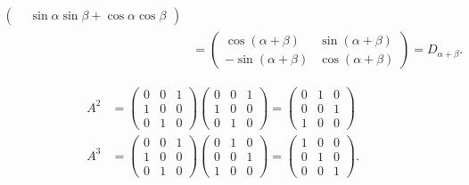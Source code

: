 \begin{loesung}
\begin{teilaufgaben}
\begin{align*}
\begin{pmatrix}
	&\sin\alpha\sin\beta+\cos\alpha\cos\beta
\end{pmatrix}
\\
&=
\begin{pmatrix}
 \cos(\alpha+\beta)&\sin(\alpha+\beta)\\
-\sin(\alpha+\beta)&\cos(\alpha+\beta)
\end{pmatrix}=D_{\alpha+\beta}.
\end{align*}
\item
\begin{align*}
A^2
&=
\begin{pmatrix}0&0&1\\1&0&0\\0&1&0\end{pmatrix}
\begin{pmatrix}0&0&1\\1&0&0\\0&1&0\end{pmatrix}
=
\begin{pmatrix} 0&1&0\\ 0&0&1\\ 1&0&0\end{pmatrix}
\\
A^3&=
\begin{pmatrix}0&0&1\\1&0&0\\0&1&0\end{pmatrix}
\begin{pmatrix} 0&1&0\\ 0&0&1\\ 1&0&0\end{pmatrix}
=
\begin{pmatrix}
1&0&0\\0&1&0\\0&0&1
\end{pmatrix}.
\end{align*}
\end{teilaufgaben}
\end{loesung}
